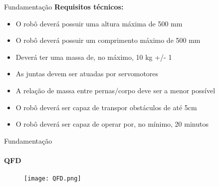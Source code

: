 \begin{frame}[t]{Fundamentação}
    \textbf{Requisitos técnicos:}
    \begin{itemize}
        \item O robô deverá possuir uma altura máxima de 500 mm
        \item O robô deverá possuir um comprimento máximo de 500 mm
        \item Deverá ter uma massa de, no máximo, 10 kg +/- 1
        \item As juntas devem ser atuadas por servomotores
        \item A relação de massa entre pernas/corpo deve ser a menor possível
        \item O robô deverá ser capaz de transpor obstáculos de até 5cm
        \item O robô deverá ser capaz de operar por, no mínimo, 20 minutos
    \end{itemize}

\end{frame}

\begin{frame}[t]{Fundamentação}
    \framesubtitle{QFD}
    \begin{figure}
        \texttt{[image: QFD.png]}
    \end{figure}

\end{frame}

